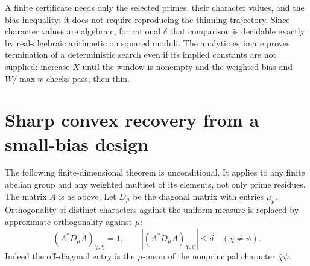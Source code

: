 \documentclass[11pt]{article}
\theoremstyle{remark}\newtheorem{remark}[theorem]{Remark}
\begin{document}
A finite certificate needs only the selected primes, their character values, and the bias inequality; it does not require reproducing the thinning trajectory. Since character values are algebraic, for rational $\delta$ that comparison is decidable exactly by real-algebraic arithmetic on squared moduli. The analytic estimate proves termination of a deterministic search even if its implied constants are not supplied: increase $X$ until the window is nonempty and the weighted bias and $W/\max w$ checks pass, then thin.

\section{Sharp convex recovery from a small-bias design}\label{sec:algebra}
The following finite-dimensional theorem is unconditional. It applies to any finite abelian group and any weighted multiset of its elements, not only prime residues. The matrix $A$ is as above. Let $D_\mu$ be the diagonal matrix with entries $\mu_p$. Orthogonality of distinct characters against the uniform measure is replaced by approximate orthogonality against $\mu$:
\begin{equation}\label{eq:gram}
 (A^*D_\mu A)_{\chi,\chi}=1,\qquad
 |(A^*D_\mu A)_{\chi,\psi}|\le\delta\quad(\chi\ne\psi).
\end{equation}
Indeed the off-diagonal entry is the $\mu$-mean of the nonprincipal character $\bar\chi\psi$.
\end{document}
